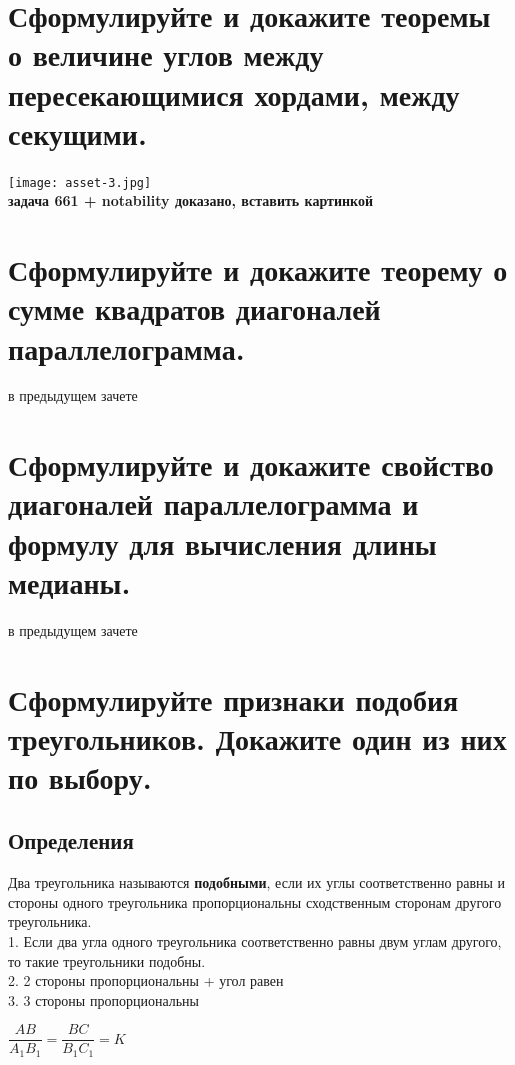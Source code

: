 \documentclass[12pt, letterpaper]{article}
\begin{document}
\section {Сформулируйте и докажите теоремы о величине углов между пересекающимися хордами, между секущими.}
\texttt{[image: asset-3.jpg]} \\
\textbf{задача 661 + notability доказано, вставить картинкой} \\

\section {Сформулируйте и докажите теорему о сумме квадратов диагоналей параллелограмма.}
в предыдущем зачете

\section {Сформулируйте и докажите свойство диагоналей параллелограмма и формулу для вычисления длины медианы.}
в предыдущем зачете

\section {Сформулируйте признаки подобия треугольников. Докажите один из них по выбору.}
\subsection{Определения}
Два треугольника называются \textbf{подобными}, если их углы соответственно равны и стороны одного треугольника пропорциональны сходственным сторонам другого треугольника. \\
1. Если два угла одного треугольника соответственно равны двум углам другого, то такие треугольники подобны. \\
2. 2 стороны пропорциональны + угол равен \\
3. 3 стороны пропорциональны \\

\begin{center}
$ \dfrac{AB}{A_1 B_1} = \dfrac{BC}{B_1 C_1} = K $ \\ 
\end{center}
\end{document}
